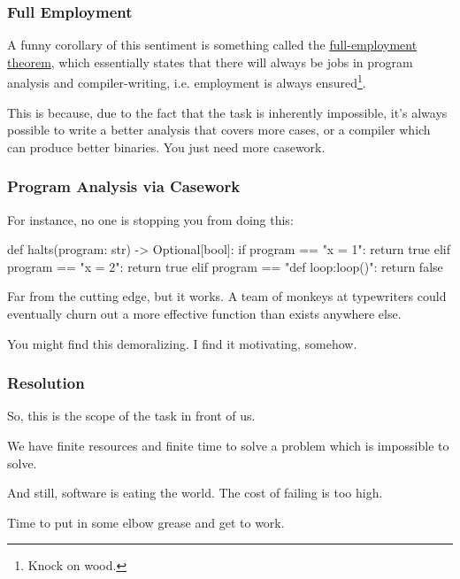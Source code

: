 \documentclass[aspectratio=169, handout]{beamer}
\begin{document}
\begin{frame}[fragile]
  \frametitle{Full Employment}

  A funny corollary of this sentiment is something called the
  {\color{blue}\href{https://en.wikipedia.org/wiki/Full-employment_theorem}{full-employment theorem}},
  which essentially states that there will always be jobs in program analysis and
  compiler-writing, i.e. employment is always ensured\footnote{Knock on wood.}.

  \pause
  \vspace{\fill}

  This is because, due to the fact that the task is inherently impossible, it's
  always possible to write a better analysis that covers more cases, or a
  compiler which can produce better binaries. You just need more casework.
\end{frame}

\begin{frame}[fragile]
  \frametitle{Program Analysis via Casework}

  For instance, no one is stopping you from doing this:
  \pause
  \begin{codeblock}[language=python]
    def halts(program: str) -> Optional[bool]:
      if program == "x = 1":
        return true
      elif program == "x = 2":
        return true
      elif program == "def loop:\n loop()":
        return false
  \end{codeblock}

  \pause
  \vspace{\fill}

  Far from the cutting edge, but it works. A team of monkeys at typewriters
  could eventually churn out a more effective  function than
  exists anywhere else.

  \pause
  \vspace{\fill}

  You might find this demoralizing. I find it motivating, somehow.
\end{frame}

\begin{frame}[fragile]
  \frametitle{Resolution}

  So, this is the scope of the task in front of us.

  \pause
  \vspace{\fill}

  We have finite resources and finite time to solve a problem which is
  impossible to solve.

  \pause
  \vspace{\fill}

  And still, software is eating the world. The cost of failing is too high.

  \pause
  \vspace{\fill}

  Time to put in some elbow grease and get to work.
\end{frame}
\end{document}
